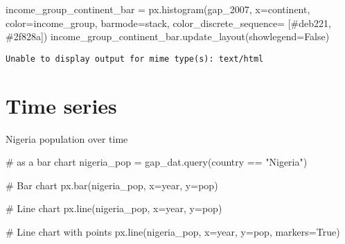 \documentclass[
  letterpaper,
  DIV=11,
  numbers=noendperiod]{scrreprt}
\newenvironment{Shaded}{\begin{snugshade}}{\end{snugshade}}
\newcommand{\CommentTok}[1]{\textcolor[rgb]{0.37,0.37,0.37}{#1}}
\newcommand{\NormalTok}[1]{\textcolor[rgb]{0.00,0.23,0.31}{#1}}
\newcommand{\OperatorTok}[1]{\textcolor[rgb]{0.37,0.37,0.37}{#1}}
\newcommand{\StringTok}[1]{\textcolor[rgb]{0.13,0.47,0.30}{#1}}
\newcommand{\VariableTok}[1]{\textcolor[rgb]{0.07,0.07,0.07}{#1}}
\begin{document}
\begin{Shaded}
\begin{Highlighting}[]
\NormalTok{income\_group\_continent\_bar }\OperatorTok{=}\NormalTok{ px.histogram(gap\_2007, x}\OperatorTok{=}\StringTok{\textquotesingle{}continent\textquotesingle{}}\NormalTok{, color}\OperatorTok{=}\StringTok{\textquotesingle{}income\_group\textquotesingle{}}\NormalTok{, barmode}\OperatorTok{=}\StringTok{\textquotesingle{}stack\textquotesingle{}}\NormalTok{, color\_discrete\_sequence}\OperatorTok{=}\NormalTok{ [}\StringTok{\textquotesingle{}\#deb221\textquotesingle{}}\NormalTok{, }\StringTok{\textquotesingle{}\#2f828a\textquotesingle{}}\NormalTok{])}
\NormalTok{income\_group\_continent\_bar.update\_layout(showlegend}\OperatorTok{=}\VariableTok{False}\NormalTok{)}
\end{Highlighting}
\end{Shaded}

\begin{verbatim}
Unable to display output for mime type(s): text/html
\end{verbatim}

\chapter{Time series}\label{time-series}

Nigeria population over time

\begin{Shaded}
\begin{Highlighting}[]
\CommentTok{\# as a bar chart}
\NormalTok{nigeria\_pop }\OperatorTok{=}\NormalTok{ gap\_dat.query(}\StringTok{\textquotesingle{}country == "Nigeria"\textquotesingle{}}\NormalTok{)}


\CommentTok{\# Bar chart}
\NormalTok{px.bar(nigeria\_pop, x}\OperatorTok{=}\StringTok{\textquotesingle{}year\textquotesingle{}}\NormalTok{, y}\OperatorTok{=}\StringTok{\textquotesingle{}pop\textquotesingle{}}\NormalTok{)}

\CommentTok{\# Line chart}
\NormalTok{px.line(nigeria\_pop, x}\OperatorTok{=}\StringTok{\textquotesingle{}year\textquotesingle{}}\NormalTok{, y}\OperatorTok{=}\StringTok{\textquotesingle{}pop\textquotesingle{}}\NormalTok{)}

\CommentTok{\# Line chart with points}
\NormalTok{px.line(nigeria\_pop, x}\OperatorTok{=}\StringTok{\textquotesingle{}year\textquotesingle{}}\NormalTok{, y}\OperatorTok{=}\StringTok{\textquotesingle{}pop\textquotesingle{}}\NormalTok{, markers}\OperatorTok{=}\VariableTok{True}\NormalTok{)}
\end{Highlighting}
\end{Shaded}
\end{document}
